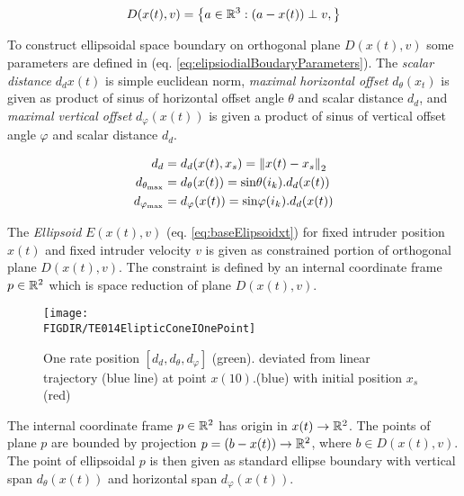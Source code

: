 \begin{equation}\label{eq:elisioidalOtrthogonalPlane}
    D({x}(t),{v})=\left\{{a}\in\mathbb{R}^3:({a}-{x}(t))\perp{v},\right\}
\end{equation}

To construct  ellipsoidal space boundary on orthogonal plane $D({x}(t),{v})$ some parameters are defined in (eq. \ref{eq:elipsiodialBoudaryParameters}). The \emph{scalar distance} $d_d{{x}(t)}$ is simple euclidean norm, \emph{maximal horizontal offset} $d_\theta({x}_t)$ is given as product of sinus of horizontal offset angle $\theta$ and scalar distance $d_d$, and \emph{maximal vertical offset} $d_\varphi({x}(t))$ is given a product of sinus of vertical offset angle $\varphi$ and scalar distance $d_d$.

\begin{equation}\label{eq:elipsiodialBoudaryParameters}
    \begin{aligned}
     d_d                      &=d_d({x}(t),{x}_s) =\left\lVert{x}(t)-{x}_s\right\rVert_2\\ 
     d_{\theta_{\text{max}}}  &= d_\theta({x}(t))=\text{sin}\theta   (i_k).d_d({x}(t))\\
     d_{\varphi_{\text{max}}} &= d_\varphi({x}(t))=\text{sin}\varphi (i_k).d_d({x}(t)) 
    \end{aligned}
\end{equation}


\noindent The \emph{Ellipsoid} $E({x}(t),{v})$ (eq. \ref{eq:baseElipsoidxt}) for fixed intruder position ${x}(t)$ and fixed intruder velocity ${v}$ is given as constrained portion of orthogonal plane $D({x}(t),{v})$. The constraint is defined by an internal coordinate frame ${p}\in \mathbb{R}^2$ which is space reduction of plane $D({x}(t),{v})$. 


\begin{figure}[H]
    \centering
    \texttt{[image: \\FIGDIR/TE014ElipticConeIOnePoint]}         
    \caption{One rate position $[d_d,d_\theta,d_\varphi]$ (green). deviated from linear trajectory (blue line) at point ${x}(10)$.(blue) with initial position $x_s$ (red)}
    \label{fig:P21ElipticConeIOnePoint}
\end{figure}


The internal coordinate frame ${p}\in\mathbb{R}^2$ has origin in ${x}(t)\to\mathbb{R}^2$. The points of plane ${p}$ are bounded by projection ${p}=({b}-{x}(t))\to\mathbb{R}^2$, where $b\in D({x}(t),v)$. The point of ellipsoidal ${p}$ is then given as standard ellipse boundary with vertical span $d_\theta({x}(t))$ and horizontal span $d_\varphi({x}(t))$. 


